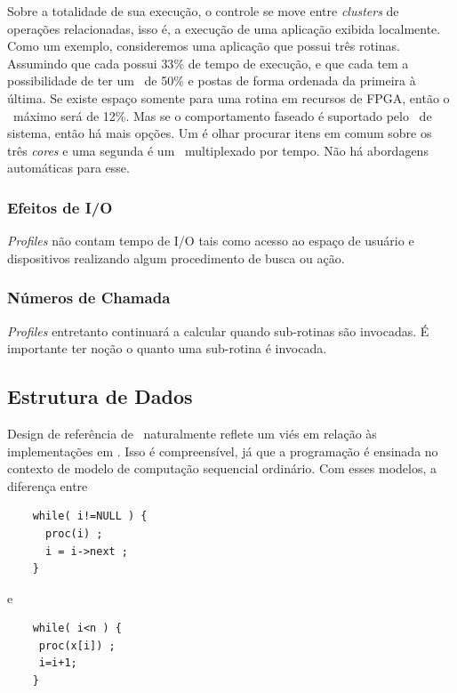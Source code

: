 			Sobre a totalidade de sua execução, o controle se move entre \textit{clusters} de operações relacionadas, isso é, a execução de uma aplicação exibida localmente. Como um exemplo, consideremos uma aplicação que possui três rotinas. Assumindo que cada possui $ 33\% $ de tempo de execução, e que cada tem a possibilidade de ter um \speedup\ de 50\% e postas de forma ordenada da primeira à última. Se existe espaço somente para uma rotina em recursos de FPGA, então o \speedup\ máximo será de 12\%. Mas se o comportamento faseado é suportado pelo \design\ de sistema, então há mais opções. Um é olhar procurar itens em comum sobre os três \textit{cores} e uma segunda é um \hardware\ multiplexado por tempo. Não há abordagens automáticas para esse.



		\subsubsection{Efeitos de I/O}

			\textit{Profiles} não contam tempo de I/O tais como acesso ao espaço de usuário e dispositivos realizando algum procedimento de busca ou ação.



		\subsubsection{Números de Chamada}

			\textit{Profiles} entretanto continuará a calcular quando sub-rotinas são invocadas. É importante ter noção o quanto uma sub-rotina é invocada.

	\subsection{Estrutura de Dados}

		Design de referência de \software\ naturalmente reflete um viés em relação às implementações em \software. Isso é compreensível, já que a programação é ensinada no contexto de modelo de computação sequencial ordinário. Com esses modelos, a diferença entre

	\begin{verbatim}
	while( i!=NULL ) {
	  proc(i) ;
	  i = i->next ;
	}
	\end{verbatim}
	e
	\begin{verbatim}
	while( i<n ) {
	 proc(x[i]) ;
	 i=i+1;
	}
	\end{verbatim}

